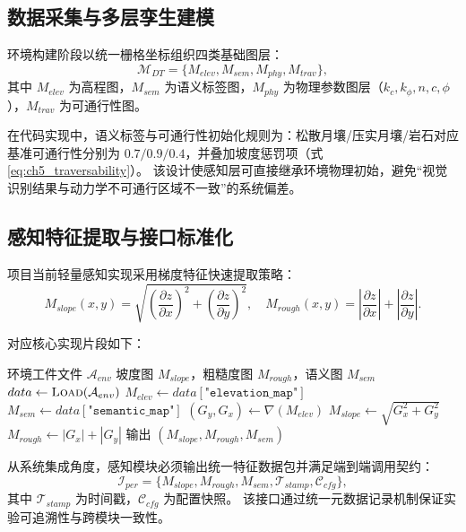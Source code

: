 \documentclass[UTF8,zihao=-4,a4paper,oneside,openany]{ctexrep}
\numberwithin{equation}{chapter}
\theoremstyle{plain}
\theoremstyle{definition}
\begin{document}
\subsection{数据采集与多层孪生建模}

环境构建阶段以统一栅格坐标组织四类基础图层：
\begin{equation}
\mathcal{M}_{DT}=\{M_{elev},M_{sem},M_{phy},M_{trav}\},
\label{eq:ch5_dt_map_set}
\end{equation}
其中 $M_{elev}$ 为高程图，$M_{sem}$ 为语义标签图，$M_{phy}$ 为物理参数图层（$k_c,k_\phi,n,c,\phi$），$M_{trav}$ 为可通行性图。

在代码实现中，语义标签与可通行性初始化规则为：松散月壤/压实月壤/岩石对应基准可通行性分别为 $0.7/0.9/0.4$，并叠加坡度惩罚项（式\eqref{eq:ch5_traversability}）。
该设计使感知层可直接继承环境物理初始，避免“视觉识别结果与动力学不可通行区域不一致”的系统偏差。

\subsection{感知特征提取与接口标准化}

项目当前轻量感知实现采用梯度特征快速提取策略：
\begin{equation}
M_{slope}(x,y)=\sqrt{\left(\frac{\partial z}{\partial x}\right)^2+\left(\frac{\partial z}{\partial y}\right)^2},
\quad
M_{rough}(x,y)=\left|\frac{\partial z}{\partial x}\right|+\left|\frac{\partial z}{\partial y}\right|.
\label{eq:ch5_slope_roughness}
\end{equation}

对应核心实现片段如下：
\begin{algorithm}[H]
\caption{感知特征提取核心伪代码}
\label{lst:ch5_perception_pipeline}
\begin{algorithmic}[1]
\REQUIRE 环境工件文件 $\mathcal{A}_{env}$
\ENSURE 坡度图 $M_{slope}$，粗糙度图 $M_{rough}$，语义图 $M_{sem}$
\STATE $data \leftarrow \textsc{Load}(\mathcal{A}_{env})$
\STATE $M_{elev} \leftarrow data[\texttt{"elevation\_map"}]$
\STATE $M_{sem} \leftarrow data[\texttt{"semantic\_map"}]$
\STATE $(G_y, G_x) \leftarrow \nabla(M_{elev})$
\STATE $M_{slope} \leftarrow \sqrt{G_x^2 + G_y^2}$
\STATE $M_{rough} \leftarrow |G_x| + |G_y|$
\STATE 输出 $(M_{slope}, M_{rough}, M_{sem})$
\end{algorithmic}
\end{algorithm}

从系统集成角度，感知模块必须输出统一特征数据包并满足端到端调用契约：
\begin{equation}
\mathcal{I}_{per}=\{M_{slope},M_{rough},M_{sem},\mathcal{T}_{stamp},\mathcal{C}_{cfg}\},
\label{eq:ch5_perception_interface}
\end{equation}
其中 $\mathcal{T}_{stamp}$ 为时间戳，$\mathcal{C}_{cfg}$ 为配置快照。
该接口通过统一元数据记录机制保证实验可追溯性与跨模块一致性。
\end{document}
